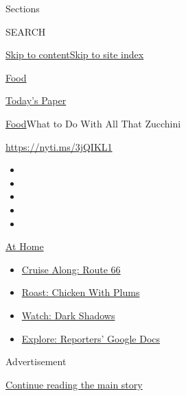 Sections

SEARCH

\protect\hyperlink{site-content}{Skip to
content}\protect\hyperlink{site-index}{Skip to site index}

\href{https://www.nytimes3xbfgragh.onion/section/food}{Food}

\href{https://myaccount.nytimes3xbfgragh.onion/auth/login?response_type=cookie\&client_id=vi}{}

\href{https://www.nytimes3xbfgragh.onion/section/todayspaper}{Today's
Paper}

\href{/section/food}{Food}\textbar{}What to Do With All That Zucchini

\url{https://nyti.ms/3jQIKL1}

\begin{itemize}
\item
\item
\item
\item
\item
\end{itemize}

\href{https://www.nytimes3xbfgragh.onion/spotlight/at-home?action=click\&pgtype=Article\&state=default\&region=TOP_BANNER\&context=at_home_menu}{At
Home}

\begin{itemize}
\tightlist
\item
  \href{https://www.nytimes3xbfgragh.onion/2020/09/07/travel/route-66.html?action=click\&pgtype=Article\&state=default\&region=TOP_BANNER\&context=at_home_menu}{Cruise
  Along: Route 66}
\item
  \href{https://www.nytimes3xbfgragh.onion/2020/09/04/dining/sheet-pan-chicken.html?action=click\&pgtype=Article\&state=default\&region=TOP_BANNER\&context=at_home_menu}{Roast:
  Chicken With Plums}
\item
  \href{https://www.nytimes3xbfgragh.onion/2020/09/04/arts/television/dark-shadows-stream.html?action=click\&pgtype=Article\&state=default\&region=TOP_BANNER\&context=at_home_menu}{Watch:
  Dark Shadows}
\item
  \href{https://www.nytimes3xbfgragh.onion/interactive/2020/at-home/even-more-reporters-editors-diaries-lists-recommendations.html?action=click\&pgtype=Article\&state=default\&region=TOP_BANNER\&context=at_home_menu}{Explore:
  Reporters' Google Docs}
\end{itemize}

Advertisement

\protect\hyperlink{after-top}{Continue reading the main story}

